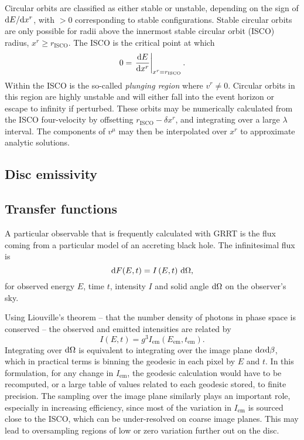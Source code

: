 Circular orbits are classified as either stable or unstable, depending on the sign of $\text{d} E / \text{d} x^r$, with $>0$ corresponding to stable configurations. Stable circular orbits are only possible for radii above the innermost stable circular orbit (ISCO) radius, $x^r \geq r_\text{ISCO}$. The ISCO is the critical point at which 
\begin{equation}
    0 = \left. \frac{\text{d} E}{\text{d} x^r} \right\rvert_{x^r = r_\text{ISCO}}.
\end{equation}
Within the ISCO is the so-called \textit{plunging region} where $v^r \neq 0$. Circular orbits in this region are highly unstable and will either fall into the event horizon or escape to infinity if perturbed. These orbits may be numerically calculated from the ISCO four-velocity by offsetting $r_\text{ISCO} -  \delta x^r$, and integrating over a large $\lambda$ interval. The components of $v^\mu$ may then be interpolated over $x^r$ to approximate analytic solutions.



\subsection{Disc emissivity}


\subsection{Transfer functions}

A particular observable that is frequently calculated with GRRT is the flux coming from a particular model of an accreting black hole. The infinitesimal flux is
\begin{equation}
\text{d} F(E, t) = I\left(E, t\right)\, \text{d} \Omega,
\end{equation}
for observed energy $E$, time $t$, intensity $I$ and solid angle $\text{d} \Omega$ on the observer's sky.

Using Liouville's theorem -- that the number density of photons in phase space is conserved -- the observed and emitted intensities are related by
\begin{equation}
    I\left( E, t \right) = g^3 I_\text{em}\left(E_\text{em}, t_\text{em}\right).
\end{equation}
Integrating over $\text{d} \Omega$ is equivalent to integrating over the image plane $\text{d} \alpha \text{d} \beta$, which in practical terms is binning the geodesic in each pixel by $E$ and $t$. In this formulation, for any change in $I_\text{em}$, the geodesic calculation would have to be recomputed, or a large table of values related to each geodesic stored, to finite precision. The sampling over the image plane similarly plays an important role, especially in increasing efficiency, since most of the variation in $I_\text{em}$ is sourced close to the ISCO, which can be under-resolved on coarse image planes. This may lead to oversampling regions of low or zero variation further out on the disc.

